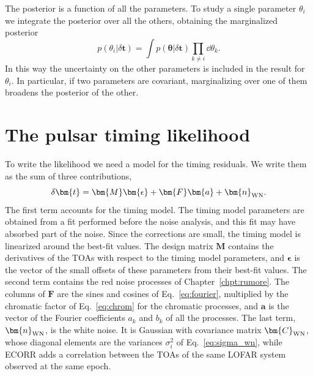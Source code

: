 The posterior is a function of all the parameters. To study a single parameter
$\theta_i$ we integrate the posterior over all the others, obtaining the
marginalized posterior
\begin{equation}
    p(\theta_i|\delta\bm{t}) = \int p(\bm{\theta}|\delta\bm{t})
    \prod_{k\neq i}\dd\theta_k .
    \label{eq:marginal}
\end{equation}
In this way the uncertainty on the other parameters is included in the result
for $\theta_i$. In particular, if two parameters are covariant, marginalizing
over one of them broadens the posterior of the other.

\section{The pulsar timing likelihood} \label{sec:likelihood}

To write the likelihood we need a model for the timing residuals. We write
them as the sum of three contributions,
\begin{equation}
    \delta\bm{t} = \bm{M}\bm{\epsilon} + \bm{F}\bm{a} + \bm{n}_{\rm WN}.
    \label{eq:modello_residui}
\end{equation}
The first term accounts for the timing model. The timing model parameters are
obtained from a fit performed before the noise analysis, and this fit may have
absorbed part of the noise. Since the corrections are small, the timing model
is linearized around the best-fit values. The design matrix $\bm{M}$ contains
the derivatives of the TOAs with respect to the timing model parameters, and
$\bm{\epsilon}$ is the vector of the small offsets of these parameters from
their best-fit values. The second term contains the red noise processes of
Chapter~\ref{chpt:rumore}. The columns of $\bm{F}$ are the sines and cosines of
Eq.~\eqref{eq:fourier}, multiplied by the chromatic factor of
Eq.~\eqref{eq:chrom} for the chromatic processes, and $\bm{a}$ is the vector of
the Fourier coefficients $a_k$ and $b_k$ of all the processes. The last term,
$\bm{n}_{\rm WN}$, is the white noise. It is Gaussian with covariance matrix
$\bm{C}_{\rm WN}$, whose diagonal elements are the variances $\sigma_i^2$ of
Eq.~\eqref{eq:sigma_wn}, while ECORR adds a correlation between the TOAs of
the same LOFAR system observed at the same epoch.

